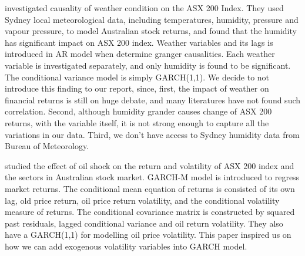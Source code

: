\documentclass[11pt]{article}
\begin{document}
\cite{Weather} investigated causality of weather condition on the ASX 200 Index. They used Sydney local meteorological data, including temperatures, humidity, pressure and vapour pressure, to model Australian stock returns, and found that the humidity has significant impact on ASX 200 index. Weather variables and its lags is introduced in AR model when determine granger causalities. Each weather variable is investigated separately, and only humidity is found to be significant. The conditional variance model is simply GARCH(1,1). We decide to not introduce this finding to our report, since, first, the impact of weather on financial returns is still on huge debate, and many literatures have not found such correlation. Second, although humidity grander causes change of ASX 200 returns, with the variable itself, it is not strong enough to capture all the variations in our data. Third, we don’t have access to Sydney humidity data from Bureau of Meteorology. 

\cite{oil} studied the effect of oil shock on the return and volatility of ASX 200 index and the sectors in Australian stock market. GARCH-M model is introduced to regress market returns. The conditional mean equation of returns is consisted of its own lag, old price return, oil price return volatility, and the conditional volatility measure of returns. The conditional covariance matrix is constructed by squared past residuals, lagged conditional variance and oil return volatility. They also have a GARCH(1,1) for modelling oil price volatility. This paper inspired us on how we can add exogenous volatility variables into GARCH model. 
\end{document}
